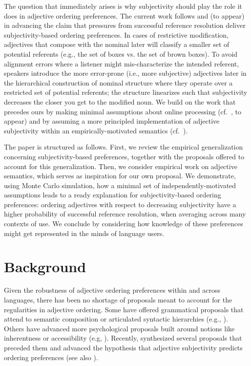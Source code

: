 \documentclass[10pt,a4paper]{article}
\begin{document}
The question that immediately arises is why subjectivity should play the role it does in adjective ordering preferences. The current work follows  and \citeauthor{scontrasetalSPadjectives} (to appear) in advancing the claim that pressures from successful reference resolution deliver subjectivity-based ordering preferences. In cases of restrictive modification, adjectives that compose with the nominal later will classify a smaller set of potential referents (e.g., the set of boxes vs. the set of brown boxes). To avoid alignment errors where a listener might mis-characterize the intended referent, speakers introduce the more error-prone (i.e., more subjective) adjectives later in the hierarchical construction of nominal structure where they operate over a restricted set of potential referents; the structure linearizes such that subjectivity decreases the closer you get to the modified noun. 
We build on the work that precedes ours by making minimal assumptions about online processing (cf.~\citeauthor{scontrasetalSPadjectives}, to appear) and by assuming a more principled implementation of adjective subjectivity within an empirically-motivated semantics (cf.~).

The paper is structured as follows. First, we review the empirical generalization concerning subjectivity-based preferences, together with the proposals offered to account for this generalization. Then, we consider empirical work on adjective semantics, which serves as inspiration for our own proposal. We demonstrate, using Monte Carlo simulation, how a minimal set of independently-motivated assumptions leads to a ready explanation for subjectivity-based ordering preferences: ordering adjectives with respect to decreasing subjectivity have a higher probability of successful reference resolution, when averaging across many contexts of use. We conclude by considering how knowledge of these preferences might get represented in the minds of language users.

\section{Background}

Given the robustness of adjective ordering preferences within and across languages, there has been no shortage of proposals meant to account for the regularities in adjective ordering. Some have offered grammatical proposals that attend to semantic composition or articulated syntactic hierarchies (e.g., ). Others have advanced more psychological proposals built around notions like inherentness or accessibility (e.g, ). Recently,  synthesized several proposals that preceded them and advanced the hypothesis that adjective subjectivity predicts ordering preferences (see also ). 
\end{document}
